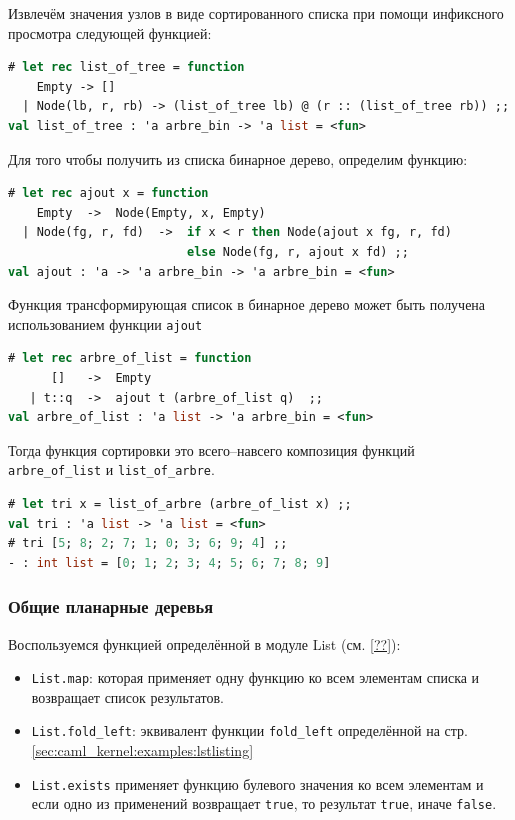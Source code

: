 Извлечём значения узлов в виде сортированного списка при помощи инфиксного
просмотра следующей функцией:

\begin{lstlisting}[language=OCaml]
# let rec list_of_tree = function
    Empty -> []
  | Node(lb, r, rb) -> (list_of_tree lb) @ (r :: (list_of_tree rb)) ;;
val list_of_tree : 'a arbre_bin -> 'a list = <fun>
\end{lstlisting}

Для того чтобы получить из списка бинарное дерево, определим функцию:

\begin{lstlisting}[language=OCaml]
# let rec ajout x = function
    Empty  ->  Node(Empty, x, Empty)
  | Node(fg, r, fd)  ->  if x < r then Node(ajout x fg, r, fd)
                         else Node(fg, r, ajout x fd) ;;
val ajout : 'a -> 'a arbre_bin -> 'a arbre_bin = <fun>
\end{lstlisting}

Функция трансформирующая список в бинарное дерево может быть получена
использованием функции \texttt{ajout}

\begin{lstlisting}[language=OCaml]
# let rec arbre_of_list = function
      []   ->  Empty
   | t::q  ->  ajout t (arbre_of_list q)  ;;
val arbre_of_list : 'a list -> 'a arbre_bin = <fun>
\end{lstlisting}

Тогда функция сортировки это всего--навсего композиция функций
\texttt{arbre\_of\_list} и \texttt{list\_of\_arbre}.

\begin{lstlisting}[language=OCaml]
# let tri x = list_of_arbre (arbre_of_list x) ;;
val tri : 'a list -> 'a list = <fun>
# tri [5; 8; 2; 7; 1; 0; 3; 6; 9; 4] ;;
- : int list = [0; 1; 2; 3; 4; 5; 6; 7; 8; 9]
\end{lstlisting}

\subsubsection{Общие планарные деревья}

Воспользуемся функцией определённой в модуле List (см. \ref{??}):

\begin{itemize}
	\item \texttt{List.map}: которая применяет одну функцию ко всем элементам
списка и возвращает список результатов.

	\item \texttt{List.fold\_left}: эквивалент функции \texttt{fold\_left}
определённой на стр. \ref{sec:caml_kernel:examples:lstlisting}

	\item \texttt{List.exists} применяет функцию булевого значения ко всем
элементам и если одно из применений возвращает \texttt{true}, то результат
\texttt{true}, иначе \texttt{false}. 
\end{itemize}

